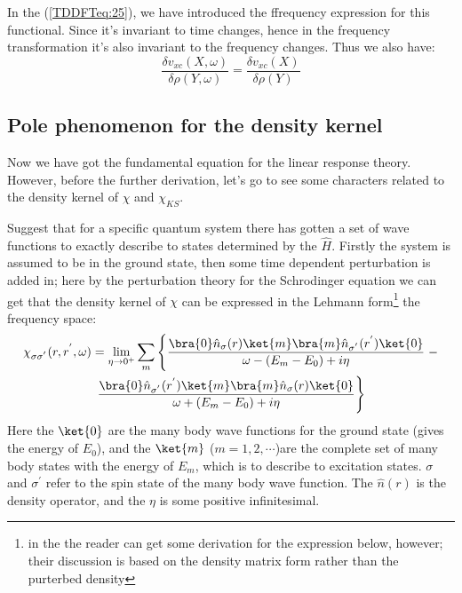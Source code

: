 In the (\ref{TDDFTeq:25}), we have introduced the ffrequency
expression for this functional. Since it's invariant to time changes,
hence in the frequency transformation it's also invariant to the
frequency changes. Thus we also have:
\begin{equation}
\frac{\delta v_{xc}(X,\omega)}{\delta
\rho(Y,\omega)} =  \frac{\delta v_{xc}(X)}{\delta
\rho(Y)}
\end{equation} 
 

\subsection{Pole phenomenon for the density kernel}
%
%
%
%
%
Now we have got the fundamental equation for the linear response
theory. However, before the further derivation, let's
go to see some characters related to the density kernel of $\chi$
and $\chi_{KS}$.

Suggest that for a specific quantum system there has gotten a set of
wave functions to exactly describe to states determined by the
$\hat{H}$. Firstly the system is assumed to be in the ground state,
then some time dependent perturbation is added in; here by the
perturbation theory for the Schrodinger equation we can get that the
density kernel of $\chi$ can be expressed in the Lehmann
form\footnote{in the \cite{Casida1} the reader can get some
derivation for the  expression below, however; their discussion is
based on the density matrix form rather than the purterbed density}
the frequency space:
\begin{multline}\label{TDDFTeq:28}
\chi_{\sigma\sigma^{'}}(r,r^{'},\omega) =
\lim_{\eta \rightarrow 0^{+}}\sum_{m}\left\{
\frac{\bra{0}\hat{n}_{\sigma}(r)\ket{m}
      \bra{m}\hat{n}_{\sigma^{'}}(r^{'})\ket{0}}
      {\omega - (E_{m} - E_{0})+ i\eta}
      \right. - \\
\left. \frac{\bra{0}\hat{n}_{\sigma^{'}}(r^{'})\ket{m}
      \bra{m}\hat{n}_{\sigma}(r)\ket{0}}
      {\omega + (E_{m} - E_{0})+ i\eta}
\right\}
\end{multline}
Here the $\ket{0}$ are the many body wave functions for the ground
state (gives the energy of $E_{0}$), and the $\ket{m}$
($m=1,2,\cdots$)are the complete set of many body states with the
energy of $E_{m}$, which is to describe to excitation states. $\sigma$
and $\sigma^{'}$ refer to the spin state of the many body wave
function. The $\hat{n}(r)$ is the density operator, and the $\eta$ is
some positive infinitesimal.

